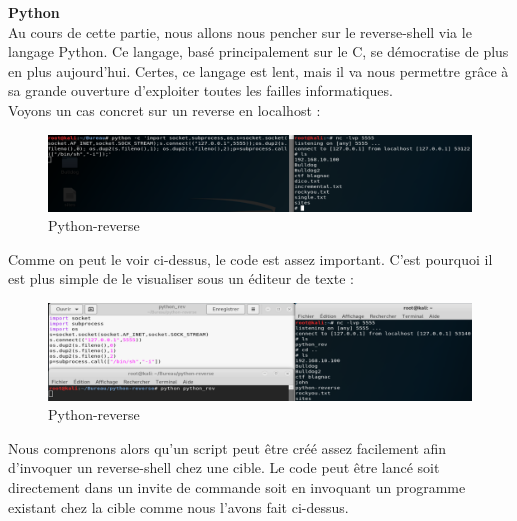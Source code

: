 \noindent \textbf{Python}\\

Au cours de cette partie, nous allons nous pencher sur le reverse-shell via le langage Python. Ce langage, basé principalement sur le C, se démocratise de plus en plus aujourd'hui. Certes, ce langage est lent, mais il va nous permettre grâce à sa grande ouverture d'exploiter toutes les failles informatiques.\\

Voyons un cas concret sur un reverse en localhost :

\begin{figure}[htp!]
  \centering
  \setlength\figureheight{9cm}
  \setlength\figurewidth{7cm}
  \includegraphics[width=1\textwidth]{oui/Ancien/imangeancien/Reverse-Shell/Python/python-reverse.PNG}
  \caption{Python-reverse}
  \label{fig:courbe-tikz}
\end{figure}

Comme on peut le voir ci-dessus, le code est assez important. C'est pourquoi il est plus simple de le visualiser sous un éditeur de texte :

\begin{figure}[htp!]
  \centering
  \setlength\figureheight{9cm}
  \setlength\figurewidth{7cm}
  \includegraphics[width=1\textwidth]{oui/Ancien/imangeancien/Reverse-Shell/Python/python_code.PNG}
  \caption{Python-reverse}
  \label{fig:courbe-tikz}
\end{figure}

Nous comprenons alors qu'un script peut être créé assez facilement afin d'invoquer un reverse-shell chez une cible. Le code peut être lancé soit directement dans un invite de commande soit en invoquant un programme existant chez la cible comme nous l'avons fait ci-dessus.






